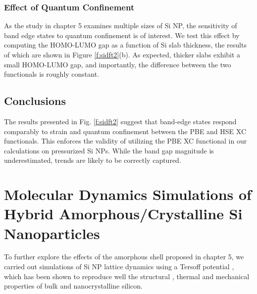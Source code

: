 \subsubsection{Effect of Quantum Confinement} As the study in chapter 5 examines multiple sizes of Si NP, the sensitivity of band edge states to quantum confinement is of interest. We test this effect by computing the HOMO-LUMO gap as a function of Si slab thickness, the results of which are shown in Figure \ref{f:sidft2}(b). As expected, thicker slabs exhibit a small HOMO-LUMO gap, and importantly, the difference between the two functionals is roughly constant.

\subsection{Conclusions} The results presented in Fig. \ref{f:sidft2} suggest that band-edge states respond comparably to strain and quantum confinement between the PBE and HSE XC functionals. This enforces the validity of utilizing the PBE XC functional in our calculations on pressurized Si NPs. While the band gap magnitude is underestimated, trends are likely to be correctly captured. 

\section{Molecular Dynamics Simulations of Hybrid Amorphous/Crystalline Si Nanoparticles}
To further explore the effects of the amorphous shell proposed in chapter 5, we carried out simulations of Si NP lattice dynamics using a Tersoff potential \cite{PhysRevB.37.6991}, which has been shown to reproduce well the structural \cite{chen2012molecular, PhysRevB.37.6991}, thermal \cite{jiang2013modulation} and mechanical \cite{zhang2011deformation} properties of bulk and nanocrystalline silicon. 

